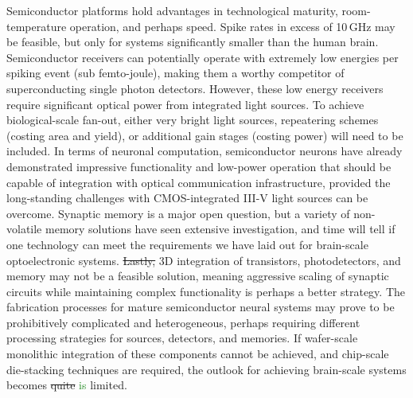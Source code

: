 \documentclass[twocolumn]{article}
\begin{document}
Semiconductor platforms hold advantages in technological maturity, room-temperature operation, and perhaps speed. Spike rates in excess of 10\,GHz may be feasible, but only for systems significantly smaller than the human brain. Semiconductor receivers can potentially operate with extremely low energies per spiking event (sub femto-joule), making them a worthy competitor of superconducting single photon detectors. However, these low energy receivers require significant optical power from integrated light sources. To achieve biological-scale fan-out, either very bright light sources, repeatering schemes (costing area and yield), or additional gain stages (costing power) will need to be included. In terms of neuronal computation, semiconductor neurons have already demonstrated impressive functionality and low-power operation that should be capable of integration with optical communication infrastructure, provided the long-standing challenges with CMOS-integrated III-V light sources can be overcome. Synaptic memory is a major open question, but a variety of non-volatile memory solutions have seen extensive investigation, and time will tell if one technology can meet the requirements we have laid out for brain-scale optoelectronic systems. \sout{Lastly, }3D integration of transistors, photodetectors, and memory may not be a feasible solution, meaning aggressive scaling of synaptic circuits while maintaining complex functionality is perhaps a better strategy. The fabrication processes for mature semiconductor neural systems may prove to be prohibitively complicated and heterogeneous, perhaps requiring different processing strategies for sources, detectors, and memories. If wafer-scale monolithic integration of these components cannot be achieved, and chip-scale die-stacking techniques are required, the outlook for achieving brain-scale systems becomes \sout{quite} \textcolor{ForestGreen}{is} limited.
\end{document}

